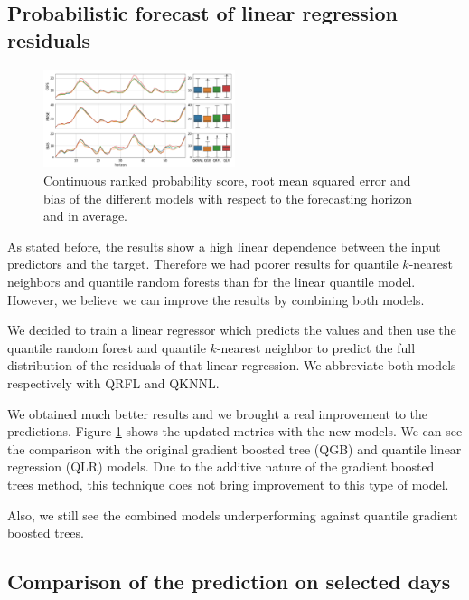\documentclass[a4paper,twocolumn,5p]{elsarticle}
\begin{document}
\subsection{Probabilistic forecast of linear regression residuals}

\begin{figure}[tbp]
  \centering
  \includegraphics[width=0.5\textwidth]{errorGraph_rfl_knnl}
  \caption{Continuous ranked probability score, root mean squared
    error and bias of the different models with respect to the
    forecasting horizon and in average.}
  \label{figure:errorGraph_rfl}
\end{figure}

As stated before, the results show a high linear dependence between
the input predictors and the target. Therefore we had poorer results
for quantile $k$-nearest neighbors and quantile random forests 
than for the linear
quantile model. However, we believe we can improve the results by
combining both models.

We decided to train a linear regressor which predicts the
\no values and then use the quantile random forest and quantile
$k$-nearest neighbor to predict the full distribution of the residuals
of that linear regression. We abbreviate both models respectively with
QRFL and QKNNL.

We obtained much better results and we brought a real improvement to
the predictions. Figure \ref{figure:errorGraph_rfl} shows the updated
metrics with the new models.  We can see the comparison with the
original gradient boosted tree (QGB) and 
quantile linear regression (QLR) models. Due to the additive 
nature of the gradient boosted trees method, this technique does not 
bring improvement to this type of model.

Also, we still see the combined models 
underperforming against quantile gradient boosted
trees.

\subsection{Comparison of the prediction on selected days}
\end{document}
